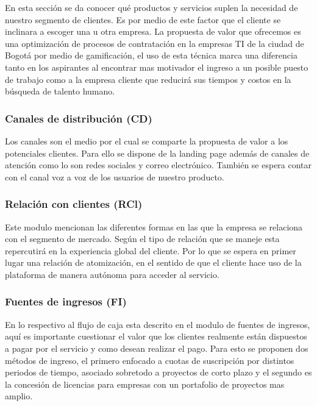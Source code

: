 En esta sección se da conocer qué productos y servicios suplen la necesidad de nuestro segmento de clientes. Es por medio de este factor que el cliente se inclinara a escoger una u otra empresa. La propuesta de valor que ofrecemos es una optimización de procesos de contratación en la empresas TI de la ciudad de Bogotá por medio de gamificación, el uso de esta técnica marca una diferencia tanto en los aspirantes al encontrar mas motivador el ingreso a un posible puesto de trabajo como a la empresa cliente que reducirá sus tiempos y costos en la búsqueda de talento humano.

\subsubsection*{Canales de distribución (CD)}

Los canales son el medio por el cual se comparte la propuesta de valor a los potenciales clientes. Para ello se dispone de la landing page además de canales de atención como lo son redes sociales y correo electrónico. También se espera contar con el canal voz a voz de los usuarios de nuestro producto.

\subsubsection*{Relación con clientes (RCl)}

Este modulo mencionan las diferentes formas en las que la empresa se relaciona con el segmento de mercado. Según el tipo de relación que se maneje esta repercutirá en la experiencia global del cliente. Por lo que se espera en primer lugar una relación de atomización, en el sentido de que el cliente hace uso de la plataforma de manera autónoma para acceder al servicio.

\subsubsection*{Fuentes de ingresos (FI)}

En lo respectivo al flujo de caja esta descrito en el modulo de fuentes de ingresos, aquí es importante cuestionar el valor que los clientes realmente están dispuestos a pagar por el servicio y como desean realizar el pago. Para esto se proponen dos métodos de ingreso, el primero enfocado a cuotas de suscripción por distintos periodos de tiempo, asociado sobretodo a proyectos de corto plazo y el segundo es la concesión de licencias para empresas con un portafolio de proyectos mas amplio.

